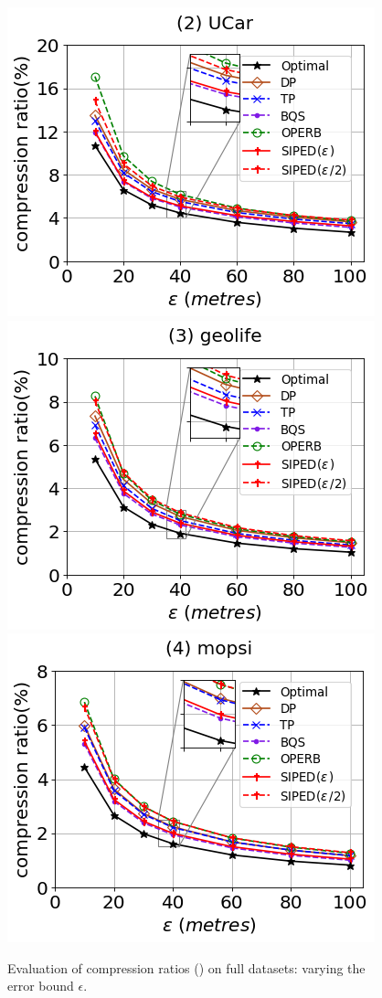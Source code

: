 \begin{figure}[tb!]
	\centering
	\includegraphics[scale=0.320]{Figures/Exp-PED-CR-epsilon-service.png} 	\hspace{3ex}
	\includegraphics[scale=0.320]{Figures/Exp-PED-CR-epsilon-geolife.png}	\hspace{3ex}
	\includegraphics[scale=0.320]{Figures/Exp-PED-CR-epsilon-mopsi.png}		
	\vspace{-2ex}
	\caption{\small Evaluation of compression ratios (\ped) on full datasets: varying the error bound $\epsilon$.}
	\label{fig:cr-ped-epsilon}
	\vspace{-2ex}
\end{figure}

